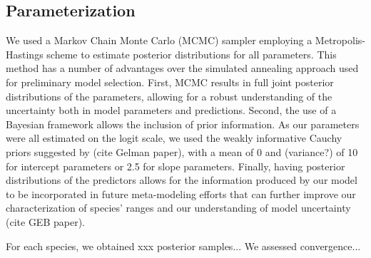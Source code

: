 \documentclass[11pt]{article}
\begin{document}
\subsection*{Parameterization}
We used a Markov Chain Monte Carlo (MCMC) sampler employing a Metropolis-Hastings scheme to estimate posterior distributions for all parameters.
This method has a number of advantages over the simulated annealing approach used for preliminary model selection.
First, MCMC results in full joint posterior distributions of the parameters, allowing for a robust understanding of the uncertainty both in model parameters and predictions.
Second, the use of a Bayesian framework allows the inclusion of prior information.
As our parameters were all estimated on the logit scale, we used the weakly informative Cauchy priors suggested by (cite Gelman paper), with a mean of 0 and (variance?) of 10 for intercept parameters or 2.5 for slope parameters.
Finally, having posterior distributions of the predictors allows for the information produced by our model to be incorporated in future meta-modeling efforts that can further improve our characterization of species' ranges and our understanding of model uncertainty (cite GEB paper).

For each species, we obtained xxx posterior samples...
We assessed convergence...
\end{document}
